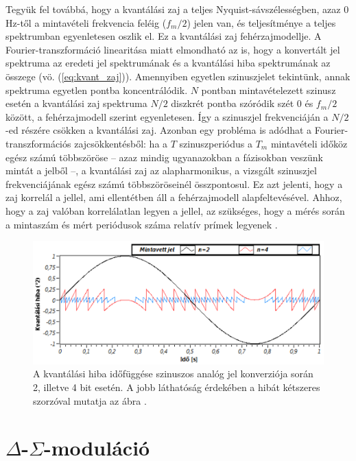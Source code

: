 \documentclass[12pt]{article}
\theoremstyle{plain}
\begin{document}
Tegyük fel továbbá, hogy a kvantálási zaj a teljes Nyquist-sávszélességben, azaz 0 Hz-től a mintavételi frekvencia feléig ($f_m/2$) jelen van, és teljesítménye a teljes spektrumban egyenletesen oszlik el. Ez a kvantálási zaj fehérzajmodellje. A Fourier-transzformáció linearitása miatt elmondható az is, hogy a konvertált jel spektruma az eredeti jel spektrumának és a kvantálási hiba spektrumának az összege (vö. (\ref{eq:kvant_zaj})). Amennyiben egyetlen szinuszjelet tekintünk, annak spektruma egyetlen pontba koncentrálódik. $N$ pontban mintavételezett szinusz esetén a kvantálási zaj spektruma $N/2$ diszkrét pontba szóródik szét 0 és $f_m/2$ között, a fehérzajmodell szerint egyenletesen. Így a szinuszjel frekvenciáján a $N/2$-ed részére csökken a kvantálási zaj. Azonban egy probléma is adódhat a Fourier-transzformációs zajcsökkentésből: ha a $T$ szinuszperiódus a $T_m$ mintavételi időköz egész számú többszöröse -- azaz mindig ugyanazokban a fázisokban veszünk mintát a jelből --, a kvantálási zaj az alapharmonikus, a vizsgált szinuszjel frekvenciájának egész számú többszöröseinél összpontosul. Ez azt jelenti, hogy a zaj korrelál a jellel, ami ellentétben áll a fehérzajmodell alapfeltevésével. Ahhoz, hogy a zaj valóban korrelálatlan legyen a jellel, az szükséges, hogy a mérés során a mintaszám és mért periódusok száma relatív prímek legyenek \cite{BME}.


\begin{figure}
	\centering
	\includegraphics[width=1\linewidth]{media/kvantalasi_hiba}
	\caption{A kvantálási hiba időfüggése szinuszos analóg jel konverziója során 2, illetve 4 bit esetén. A jobb láthatóság érdekében a hibát kétszeres szorzóval mutatja az ábra \cite{BME}.}
	\label{fig:kvantalasihiba}
\end{figure}



\section{$\Delta$-$\Sigma$-moduláció}
\end{document}
